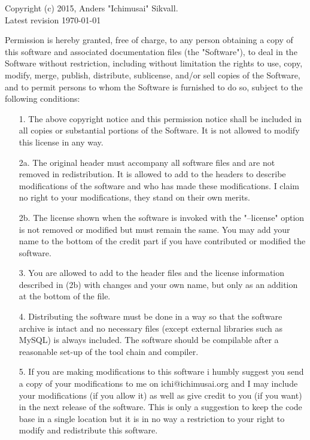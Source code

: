 \documentclass[english,twoside,openright,a4paper,12pt]{article}
\begin{document}
Copyright (c) 2015, Anders "Ichimusai" Sikvall.\\
Latest revision \today
 
Permission is hereby granted, free of charge, to any person obtaining
a copy of this software and associated documentation files (the
"Software"), to deal in the Software without restriction, including
without limitation the rights to use, copy, modify, merge, publish,
distribute, sublicense, and/or sell copies of the Software, and to
permit persons to whom the Software is furnished to do so, subject to
the following conditions:


\begin{itemize}
\item[1.] The above copyright notice and this permission notice shall
  be included in all copies or substantial portions of the Software.
  It is not allowed to modify this license in any way.
  
\item[2a.] The original header must accompany all software files and
  are not removed in redistribution. It is allowed to add to the
  headers to describe modifications of the software and who has made
  these modifications. I claim no right to your modifications, they
  stand on their own merits.
 
\item[2b.] The license shown when the software is invoked with the
  "--license" option is not removed or modified but must remain the
  same. You may add your name to the bottom of the credit part if you
  have contributed or modified the software.
 
\item[3.] You are allowed to add to the header files and the license
  information described in (2b) with changes and your own name, but
  only as an addition at the bottom of the file.
 
\item[4.] Distributing the software must be done in a way so that the
  software archive is intact and no necessary files (except external
  libraries such as MySQL) is always included. The software should be
  compilable after a reasonable set-up of the tool chain and compiler.
 
\item[5.] If you are making modifications to this software i humbly
  suggest you send a copy of your modifications to me on
  ichi@ichimusai.org and I may include your modifications (if you
  allow it) as well as give credit to you (if you want) in the next
  release of the software. This is only a suggestion to keep the code
  base in a single location but it is in no way a restriction to your
  right to modify and redistribute this software.

\end{itemize}
\end{document}
